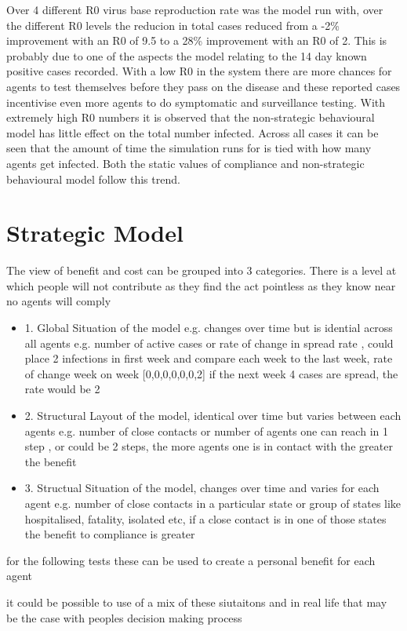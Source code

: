 \documentclass{article}
\begin{document}
Over 4 different R0 virus base reproduction rate was the model run with, over the different R0 levels the reducion in total cases reduced from a -2\% improvement with an R0 of 9.5 to a 28\% improvement with an R0 of 2. This is probably due to one of the aspects the model relating to the 14 day known positive cases recorded. With a low R0 in the system there are more chances for agents to test themselves before they pass on the disease and these reported cases incentivise even more agents to do symptomatic and surveillance testing. With extremely high R0 numbers it is observed that the non-strategic behavioural model has little effect on the total number infected. Across all cases it can be seen that the amount of time the simulation runs for is tied with how many agents get infected. Both the static values of compliance and non-strategic behavioural model follow this trend. 



\section{Strategic Model}
The view of benefit and cost can be grouped into 3 categories.
There is a level at which people will not contribute as they find the act pointless as they know near no agents  will comply 
\begin{itemize}
\item1. Global Situation of the model e.g. changes over time but is idential across all agents
e.g. number of active cases or rate of change in spread rate , could place 2 infections in first week and compare each week to the last week, rate of change week on week
[0,0,0,0,0,0,2]  if the next week 4 cases are spread, the rate would be 2
\item2. Structural Layout of the model, identical over time but varies between each agents
e.g. number of close contacts or number of agents one can reach in 1 step , or could be 2 steps, the more agents one is in contact with the greater the benefit 
\item3. Structual Situation of the model, changes over time and varies for each agent
e.g. number of close contacts in a particular state or group of states like hospitalised, fatality, isolated etc, if a close contact is in one of those states the benefit to compliance is greater
\end{itemize}

for the following tests these can be used to create a personal benefit for each agent 

it could be possible to use of a mix of these siutaitons and in real life that may be the case with peoples decision making process
\end{document}
